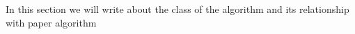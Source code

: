 \documentclass[main.tex]{subfiles}
\begin{document}
In this section we will write about the class of the algorithm and its relationship with paper algorithm\\
\newpage
\end{document}
